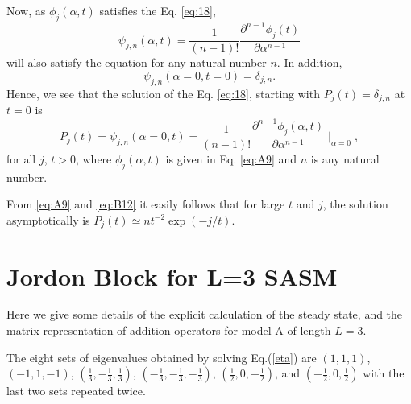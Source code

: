 \documentclass[11pt,a4paper]{book}
\begin{document}
Now, as $\phi_j(\alpha,t)$ satisfies the Eq. \eqref{eq:18},
\begin{equation}
  \psi_{j,n}(\alpha,t)=\frac{1}{(n-1)!}\frac{\partial^{n-1}\phi_j(t)}{\partial\alpha^{n-1}}
\end{equation}
will also satisfy the equation for any natural number $n$. In addition,
\begin{equation}
  \psi_{j,n}(\alpha=0,t=0)=\delta_{j,n}.
\end{equation}
Hence, we see that the solution of the Eq. \eqref{eq:18}, starting
with $P_j(t)=\delta_{j,n}$ at $t=0$ is
\begin{equation}
P_j(t)=\psi_{j,{n}}(\alpha=0,t)=\frac{1}{(n-1)!}\frac{\partial^{n-1}\phi_j(\alpha,t)}{\partial\alpha^{n-1}}\mid_{\alpha=0},
\label{eq:B12}
\end{equation}
for all $j$, $t>0$, where $\phi_j(\alpha,t)$ is given in Eq. \eqref{eq:A9} and 
$n$ is any natural number.

From \eqref{eq:A9} and \eqref{eq:B12} it easily follows that for large $t$ and $j$, the solution
asymptotically is $P_j(t)\simeq n t^{-2}\exp(-j/t)$.




\chapter{Jordon Block for L=3 SASM}
Here we give some details of the explicit calculation of the steady 
state, and the matrix representation of addition operators for model A 
of length $L=3$. 

The eight sets of eigenvalues  obtained by solving Eq.(\ref{eta})  are 
$(1, 1, 1)$, $(-1, 1, -1)$, $(\frac{1}{3}, -\frac{1}{3},\frac{1}{3})$, 
$(-\frac{1}{3}, -\frac{1}{3}, -\frac{1}{3})$, $ 
(\frac{1}{2}, 0, -\frac{1}{2})$, and $(-\frac{1}{2}, 0, \frac{1}{2})$ 
with the last two sets repeated twice.
\end{document}
